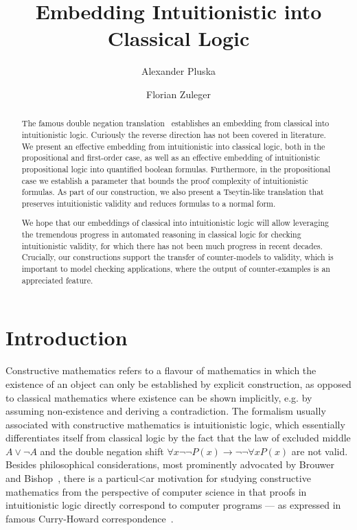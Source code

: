 \documentclass[a4paper,UKenglish,cleveref, autoref, thm-restate]{lipics-v2021}
\title{Embedding Intuitionistic into Classical Logic} %
\author{Alexander {Pluska}}{Faculty of Mathematics, Universtät Wien, Austria}{e11941874@student.tuwien.ac.at}{https://orcid.org/my-orcid?orcid=0000-0002-7709-3335}{}%
\author{Florian Zuleger}{Institute of Logic and Computation, Technische Universität Wien, Austria}{florian.zuleger@tuwien.ac.at}{https://orcid.org/0000-0003-1468-8398}{}
\begin{document}
\maketitle

\begin{abstract}
The famous double negation translation~\cite{glivenko1929quelques, godel1933intuitionistischen} establishes an embedding from classical into intuitionistic logic. Curiously the reverse direction has not been covered in literature. We present an effective embedding from intuitionistic into classical logic, both in the propositional and first-order case, as well as an effective embedding of intuitionistic propositional logic into quantified boolean formulas.
Furthermore, in the propositional case we establish a parameter that bounds the proof complexity of intuitionistic formulas. As part of our construction, we also present a Tseytin-like translation that preserves intuitionistic validity and reduces formulas to a normal form.



We hope that our embeddings of classical into intuitionistic logic will allow leveraging the tremendous progress in automated reasoning in classical logic for checking intuitionistic validity, for which there has not been much progress in recent decades. Crucially, our constructions support the transfer of counter-models to validity, which is important to model checking applications, where the output of counter-examples is an appreciated feature.
\end{abstract}

\section{Introduction}


Constructive mathematics refers to a flavour of mathematics in which the existence of an object can only be established by explicit construction, as opposed to classical mathematics where existence can be shown implicitly, e.g. by assuming non-existence and deriving a contradiction.
The formalism usually associated with constructive mathematics is intuitionistic logic, which essentially differentiates itself from classical logic by the fact that the law of excluded middle $A\vee\neg A$ and the double negation shift $\forall x\neg\neg P(x)\to\neg\neg\forall xP(x)$ are not valid.
Besides philosophical considerations, most prominently advocated by Brouwer~\cite{brouwer1907over} and Bishop~\cite{bishop1967foundations}, there is a particul<ar motivation for studying constructive mathematics from the perspective of computer science in that proofs in  intuitionistic logic directly correspond to computer programs --- as expressed in famous Curry-Howard correspondence~\cite{howard1980formulae}.
\end{document}
